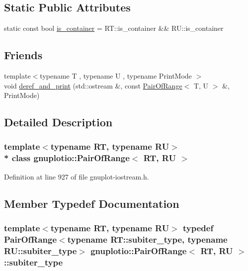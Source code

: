 \subsection*{Static Public Attributes}
\begin{DoxyCompactItemize}
\item 
static const bool \hyperlink{classgnuplotio_1_1_pair_of_range_ab49c6567f0fa6a82fa2a6245fd964659}{is\+\_\+container} = R\+T\+::is\+\_\+container \&\& R\+U\+::is\+\_\+container
\end{DoxyCompactItemize}
\subsection*{Friends}
\begin{DoxyCompactItemize}
\item 
{\footnotesize template$<$typename T , typename U , typename Print\+Mode $>$ }\\void \hyperlink{classgnuplotio_1_1_pair_of_range_aada62f803432f04aff66f3c609329520}{deref\+\_\+and\+\_\+print} (std\+::ostream \&, const \hyperlink{classgnuplotio_1_1_pair_of_range}{Pair\+Of\+Range}$<$ T, U $>$ \&, Print\+Mode)
\end{DoxyCompactItemize}


\subsection{Detailed Description}
\subsubsection*{template$<$typename RT, typename RU$>$\\*
class gnuplotio\+::\+Pair\+Of\+Range$<$ R\+T, R\+U $>$}



Definition at line 927 of file gnuplot-\/iostream.\+h.



\subsection{Member Typedef Documentation}
\subsubsection[{\texorpdfstring{subiter\+\_\+type}{subiter_type}}]{\setlength{\rightskip}{0pt plus 5cm}template$<$typename RT, typename RU$>$ typedef {\bf Pair\+Of\+Range}$<$typename R\+T\+::subiter\+\_\+type, typename R\+U\+::subiter\+\_\+type$>$ {\bf gnuplotio\+::\+Pair\+Of\+Range}$<$ RT, RU $>$\+::{\bf subiter\+\_\+type}}\hypertarget{classgnuplotio_1_1_pair_of_range_a6a7bf8a5dd4ca0563eb71b1156d6cd9f}{}\label{classgnuplotio_1_1_pair_of_range_a6a7bf8a5dd4ca0563eb71b1156d6cd9f}


